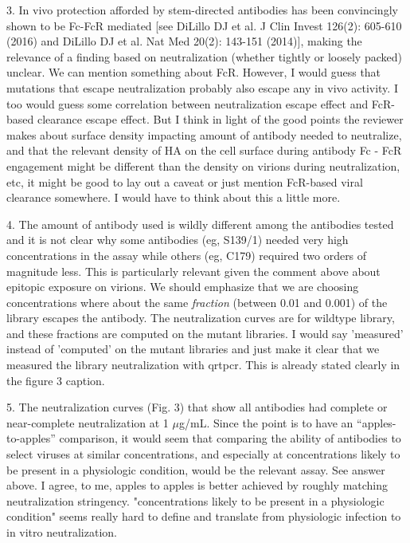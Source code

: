 \documentclass[11pt, oneside]{article}   	%
\begin{document}
3. In vivo protection afforded by stem-directed antibodies has been convincingly shown to be Fc-FcR mediated [see DiLillo DJ et al. J Clin Invest 126(2): 605-610 (2016) and DiLillo DJ et al. Nat Med 20(2): 143-151 (2014)], making the relevance of a finding based on neutralization (whether tightly or loosely packed) unclear.
{\color{red}
We can mention something about FcR.
However, I would guess that mutations that escape neutralization probably also escape any in vivo activity.
}
{\color{blue} I too would guess some correlation between neutralization escape effect and FcR-based clearance escape effect. But I think in light of the good points the reviewer makes about surface density impacting amount of antibody needed to neutralize, and that the relevant density of HA on the cell surface during antibody Fc - FcR engagement  might be different than the density on virions during neutralization, etc, it might be good to lay out a caveat or just mention FcR-based viral clearance somewhere. I would have to think about this a little more.}

4. The amount of antibody used is wildly different among the antibodies tested and it is not clear why some antibodies (eg, S139/1) needed very high concentrations in the assay while others (eg, C179) required two orders of magnitude less. This is particularly relevant given the comment above about epitopic exposure on virions.
{\color{red}
We should emphasize that we are choosing concentrations where about the same \emph{fraction} (between 0.01 and 0.001) of the library escapes the antibody.
The neutralization curves are for wildtype library, and these fractions are computed on the mutant libraries.
}
{\color{blue} I would say 'measured' instead of 'computed' on the mutant libraries and just make it clear that we measured the library neutralization with qrtpcr. This is already stated clearly in the figure 3 caption.}

5. The neutralization curves (Fig. 3) that show all antibodies had complete or near-complete neutralization at 1 $\mu$g/mL. Since the point is to have an ``apples-to-apples'' comparison, it would seem that comparing the ability of antibodies to select viruses at similar concentrations, and especially at concentrations likely to be present in a physiologic condition, would be the relevant assay.
{\color{red}
See answer above.
}
{\color{blue} I agree, to me, apples to apples is better achieved by roughly matching neutralization stringency. "concentrations likely to be present in a physiologic condition" seems really hard to define and translate from physiologic infection to in vitro neutralization.}
\end{document}
